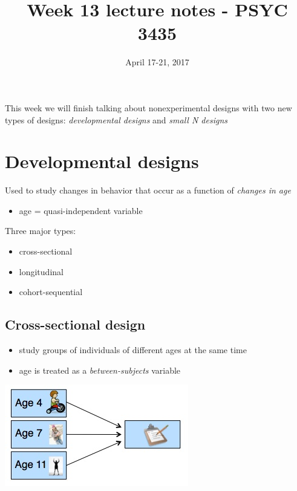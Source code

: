 \documentclass[11pt]{article}
\date{April 17-21, 2017}
\title{Week 13 lecture notes - PSYC 3435}
\begin{document}
\maketitle
This week we will finish talking about nonexperimental designs with two new types of designs: \emph{developmental designs} and \emph{small N designs}

\section*{Developmental designs}
\label{sec-1}

Used to study changes in behavior that occur as a function of \emph{changes in age}
\begin{itemize}
\item age = quasi-independent variable
\end{itemize}

Three major types:
\begin{itemize}
\item cross-sectional
\item longitudinal
\item cohort-sequential
\end{itemize}

\subsection*{Cross-sectional design}
\label{sec-1-1}
\begin{itemize}
\item study groups of individuals of different ages at the same time
\item age is treated as a \emph{between-subjects} variable
\end{itemize}

\includegraphics[width=.9\linewidth]{figures/crossSectional.jpg}
\end{document}
